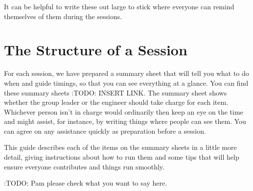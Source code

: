 \documentclass[letterpaper,10pt,english]{jupyterBook}
\begin{document}
\sphinxAtStartPar
It can be helpful to write these out large to stick where everyone can remind themselves of them during the sessions.

\sphinxstepscope


\chapter{The Structure of a Session}
\label{\detokenize{what-sessions-are-like:the-structure-of-a-session}}\label{\detokenize{what-sessions-are-like::doc}}
\sphinxAtStartPar
For each session, we have prepared a summary sheet that will tell you what to do when and guide timings, so that you can see everything at a glance.  You can find these summary sheets :TODO: INSERT LINK.  The summary sheet shows whether the group leader or the engineer should take charge for each item.  Whichever person isn’t in charge would ordinarily then keep an eye on the time and might assist, for instance, by writing things where people can see them.  You can agree on any assistance quickly as preparation before a session.

\sphinxAtStartPar
This guide describes each of the items on the summary sheets in a little more detail, giving instructions about how to run them and some tips that will help ensure everyone contributes and things run smoothly.

\sphinxAtStartPar
:TODO: Pam \sphinxhyphen{} please check what you want to say here.
\end{document}
